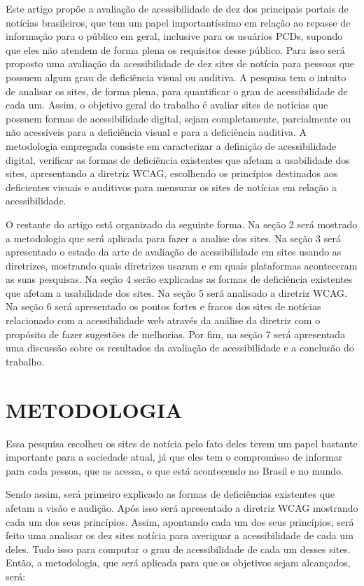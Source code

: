 \documentclass[a4paper]{article}
\begin{document}
\begin{titlepage}
Este artigo propõe a avaliação de acessibilidade de dez dos principais portais de notícias brasileiros, que tem um papel importantíssimo em relação ao repasse de informação para o público em geral, inclusive para os usuários PCDs, supondo que eles não atendem de forma plena os requisitos desse público. Para isso será proposto uma avaliação da acessibilidade de dez sites de notícia para pessoas que possuem algum grau de deficiência visual ou auditiva. A pesquisa tem o intuito de analisar os sites, de forma plena, para quantificar o grau de acessibilidade de cada um. Assim, o objetivo geral do trabalho é avaliar sites de notícias que possuem formas de acessibilidade digital, sejam completamente, parcialmente ou não acessíveis para a deficiência visual e para a deficiência auditiva. A metodologia empregada consiste em caracterizar a definição de acessibilidade digital, verificar as formas de deficiência existentes que afetam a usabilidade dos sites, apresentando a diretriz WCAG, escolhendo os princípios destinados aos deficientes visuais e auditivos para mensurar os sites de notícias em relação a acessibilidade.

O restante do artigo está organizado da seguinte forma. Na seção 2 será mostrado a metodologia que será aplicada para fazer a analise dos sites. Na seção 3 será apresentado o estado da arte de avaliação de acessibilidade em sites usando as diretrizes, mostrando quais diretrizes usaram e em quais plataformas aconteceram as suas pesquisas. Na seção 4 serão explicadas as formas de deficiência existentes que afetam a usabilidade dos sites. Na seção 5 será analisado a diretriz WCAG. Na seção 6 será apresentado os pontos fortes e fracos dos sites de notícias relacionado com a acessibilidade web através da análise da diretriz com o propósito de fazer sugestões de melhorias. Por fim, na seção 7 será apresentada uma discussão sobre os resultados da avaliação de acessibilidade e a conclusão do trabalho.

\section{METODOLOGIA}
Essa pesquisa escolheu os sites de notícia pelo fato deles terem um papel bastante importante para a sociedade atual, já que eles tem o compromisso de informar para cada pessoa, que as acessa, o que está acontecendo no Brasil e no mundo.

Sendo assim, será primeiro explicado as formas de deficiências existentes que afetam a visão e audição. Após isso será apresentado a diretriz WCAG mostrando cada um dos seus princípios. Assim, apontando cada um dos seus princípios, será feito uma analisar os dez sites notícia para averiguar a acessibilidade de cada um deles. Tudo isso para computar o grau de acessibilidade de cada um desses sites. Então, a metodologia, que será aplicada para que os objetivos sejam alcançados, será:


\end{titlepage}
\end{document}
